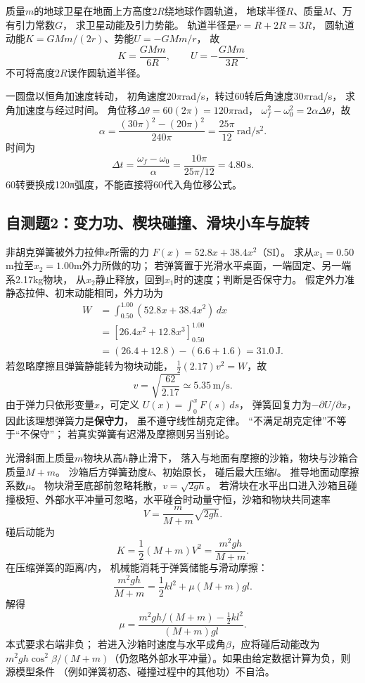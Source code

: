 \problemtext 质量$m$的地球卫星在地面上方高度$2R$绕地球作圆轨道，
地球半径$R$、质量$M$、万有引力常数$G$，
求卫星动能及引力势能。
\workings
轨道半径是$r=R+2R=3R$，
圆轨道动能$K=GMm/(2r)$、势能$U=-GMm/r$，
故
\[
\boxed{K=\frac{GMm}{6R}},\qquad
\boxed{U=-\frac{GMm}{3R}}.
\]
\crosscheck 不可将高度$2R$误作圆轨道半径。

\problemtext 一圆盘以恒角加速度转动，
初角速度$20\pi$rad/s，转过60转后角速度$30\pi$rad/s，
求角加速度与经过时间。
\workings
角位移$\Delta\theta=60(2\pi)=120\pi$rad，
$\omega_f^2-\omega_0^2=2\alpha\Delta\theta$，故
\[
\boxed{\alpha=\frac{(30\pi)^2-(20\pi)^2}{240\pi}
=\frac{25\pi}{12}\,\mathrm{rad/s^2}}.
\]
时间为
\[
\boxed{\Delta t=\frac{\omega_f-\omega_0}{\alpha}
=\frac{10\pi}{25\pi/12}=4.80\,\mathrm s}.
\]
\crosscheck 60转要换成120π弧度，不能直接将60代入角位移公式。

\subsection{自测题2：变力功、楔块碰撞、滑块小车与旋转}

\problemtext 非胡克弹簧被外力拉伸$x$所需的力
$F(x)=52.8x+38.4x^2$（SI）。
求从$x_1=0.50$m拉至$x_2=1.00$m外力所做的功；
若弹簧置于光滑水平桌面，一端固定、另一端系2.17kg物块，
从$x_2$静止释放，回到$x_1$时的速度；判断是否保守力。
\workings
假定外力准静态拉伸、初末动能相同，外力功为
\[
\begin{aligned}
W&=\int_{0.50}^{1.00}(52.8x+38.4x^2)\,dx\\
&=\left[26.4x^2+12.8x^3\right]_{0.50}^{1.00}\\
&=(26.4+12.8)-(6.6+1.6)
=\boxed{31.0\,\mathrm J}.
\end{aligned}
\]
若忽略摩擦且弹簧静能转为物块动能，
$\tfrac12(2.17)v^2=W$，故
\[
\boxed{v=\sqrt{\frac{62}{2.17}}\simeq5.35\,\mathrm{m/s}}.
\]
由于弹力只依形变量$x$，可定义
$U(x)=\int_0^xF(s)\,ds$，
弹簧回复力为$-\partial U/\partial x$，
因此该理想弹簧力是\textbf{保守力}，
虽不遵守线性胡克定律。
\crosscheck “不满足胡克定律”不等于“不保守”；
若真实弹簧有迟滞及摩擦则另当别论。

\problemtext 光滑斜面上质量$m$物块从高$h$静止滑下，
落入与地面有摩擦的沙箱，物块与沙箱合质量$M+m$。
沙箱后方弹簧劲度$k$、初始原长，
碰后最大压缩$l$。
推导地面动摩擦系数$\mu$。
\workings
物块滑至底部前忽略耗散，$v=\sqrt{2gh}$。
若滑块在水平出口进入沙箱且碰撞极短、外部水平冲量可忽略，水平碰合时动量守恒，沙箱和物块共同速率
\[
V=\frac{m}{M+m}\sqrt{2gh}.
\]
碰后动能为
\[
K=\frac12(M+m)V^2=\frac{m^2gh}{M+m}.
\]
在压缩弹簧的距离$l$内，
机械能消耗于弹簧储能与滑动摩擦：
\[
\frac{m^2gh}{M+m}=\frac12kl^2+\mu(M+m)gl.
\]
解得
\[
\boxed{\mu=
\frac{m^2gh/(M+m)-\tfrac12kl^2}{(M+m)gl}}.
\]
\crosscheck 本式要求右端非负；
若进入沙箱时速度与水平成角$\beta$，应将碰后动能改为$m^2gh\cos^2\beta/(M+m)$（仍忽略外部水平冲量）。如果由给定数据计算为负，则源模型条件
（例如弹簧初态、碰撞过程中的其他功）不自洽。

